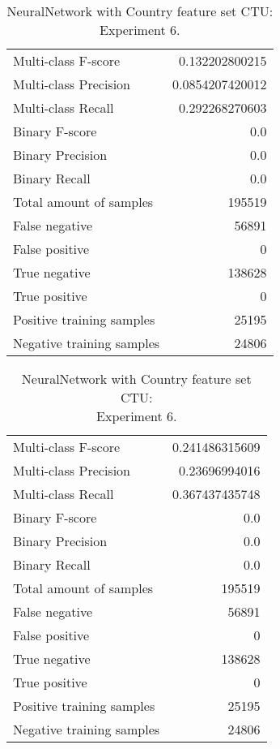 \begin{table}[H]
\begin{minipage}{0.5\textwidth}
\caption{NeuralNetwork with Country feature set CTU: \\Experiment 5.}
\centering
\begin{tabular}{l r}
\toprule
Multi-class F-score & 0.132202800215 \\
Multi-class Precision & 0.0854207420012 \\
Multi-class Recall & 0.292268270603 \\
\midrule
Binary F-score & 0.0 \\
Binary Precision & 0.0 \\
Binary Recall & 0.0 \\
\midrule
Total amount of samples & 195519 \\
False negative & 56891 \\
False positive & 0 \\
True negative & 138628 \\
True positive & 0 \\
\midrule
Positive training samples & 25195 \\
Negative training samples & 24806 \\
\bottomrule
\end{tabular}
\end{minipage}
\hfillx
\begin{minipage}{0.5\textwidth}
\caption{NeuralNetwork with Country feature set CTU: \\Experiment 6.}
\centering
\begin{tabular}{l r}
\toprule
Multi-class F-score & 0.241486315609 \\
Multi-class Precision & 0.23696994016 \\
Multi-class Recall & 0.367437435748 \\
\midrule
Binary F-score & 0.0 \\
Binary Precision & 0.0 \\
Binary Recall & 0.0 \\
\midrule
Total amount of samples & 195519 \\
False negative & 56891 \\
False positive & 0 \\
True negative & 138628 \\
True positive & 0 \\
\midrule
Positive training samples & 25195 \\
Negative training samples & 24806 \\
\bottomrule
\end{tabular}
\end{minipage}
\end{table}
